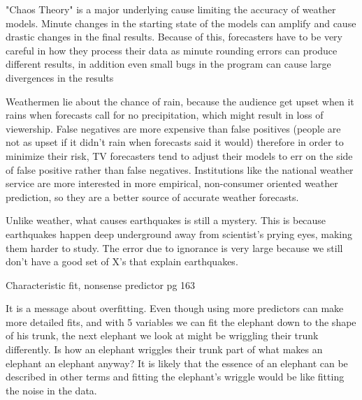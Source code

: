 \documentclass[12pt]{article}
\begin{document}
\begin{enumerate}
"Chaos Theory" is a major underlying cause limiting the accuracy of weather models. Minute changes in the starting state of the models can amplify and cause drastic changes in the final results. Because of this, forecasters have to be very  careful in how they process their data as minute rounding errors can produce different results, in addition even small bugs in the program can cause large divergences in the results


Weathermen lie about the chance of rain, because the audience get upset when it rains when forecasts call for no precipitation, which might result in loss of viewership. False negatives are more expensive than false positives (people are not as upset if it didn’t rain when forecasts said it would) therefore in order to minimize their risk, TV forecasters tend to adjust their models to err on the side of false positive rather than false negatives. Institutions like the national weather service are more interested in more empirical, non-consumer oriented weather prediction, so they are a better source of accurate weather forecasts.


Unlike weather, what causes earthquakes is still a mystery. This is because earthquakes happen deep underground away from scientist's prying eyes, making them harder to study. The error due to ignorance is very large because we still don't have a good set of X's that  explain earthquakes.




Characteristic fit, nonsense predictor pg 163


It is a message about overfitting. Even though using more predictors can make more detailed fits, and with 5 variables we can fit the elephant down to the shape of his trunk, the next elephant we look at might be wriggling their trunk differently. Is how an elephant wriggles their trunk part of what makes an elephant an elephant anyway? It is likely that the essence of an elephant can be described in   other terms and fitting the elephant's wriggle would be like fitting the noise in the data.



\end{enumerate}
\end{document}
